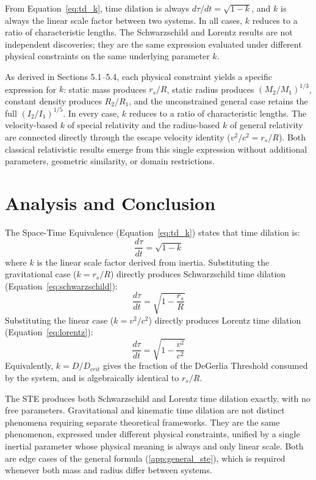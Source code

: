 From Equation~\ref{eq:td_k}, time dilation is always $d\tau/dt = \sqrt{1-k}$, and $k$ is always the linear scale factor between two systems. In all cases, $k$ reduces to a ratio of characteristic lengths. The Schwarzschild and Lorentz results are not independent discoveries; they are the same expression evaluated under different physical constraints on the same underlying parameter $k$.

As derived in Sections 5.1--5.4, each physical constraint yields a specific expression for $k$: static mass produces $r_s/R$, static radius produces $(M_2/M_1)^{1/3}$, constant density produces $R_2/R_1$, and the unconstrained general case retains the full $(I_2/I_1)^{1/5}$. In every case, $k$ reduces to a ratio of characteristic lengths. The velocity-based $k$ of special relativity and the radius-based $k$ of general relativity are connected directly through the escape velocity identity ($v^2/c^2 = r_s/R$). Both classical relativistic results emerge from this single expression without additional parameters, geometric similarity, or domain restrictions.

\section{Analysis and Conclusion}

The Space-Time Equivalence (Equation~\ref{eq:td_k}) states that time dilation is:
\[
\frac{d\tau}{dt} = \sqrt{1 - k}
\]
where $k$ is the linear scale factor derived from inertia. Substituting the gravitational case ($k = r_s/R$) directly produces Schwarzschild time dilation (Equation~\ref{eq:schwarzschild}):
\[
\frac{d\tau}{dt} = \sqrt{1 - \frac{r_s}{R}}
\]
Substituting the linear case ($k = v^2/c^2$) directly produces Lorentz time dilation (Equation~\ref{eq:lorentz}):
\[
\frac{d\tau}{dt} = \sqrt{1 - \frac{v^2}{c^2}}
\]
Equivalently, $k = D/D_{crit}$ gives the fraction of the DeGerlia Threshold consumed by the system, and is algebraically identical to $r_s/R$.

The STE produces both Schwarzschild and Lorentz time dilation exactly, with no free parameters. Gravitational and kinematic time dilation are not distinct phenomena requiring separate theoretical frameworks. They are the same phenomenon, expressed under different physical constraints, unified by a single inertial parameter whose physical meaning is always and only linear scale. Both are edge cases of the general formula (\ref{app:general_ste}), which is required whenever both mass and radius differ between systems.

